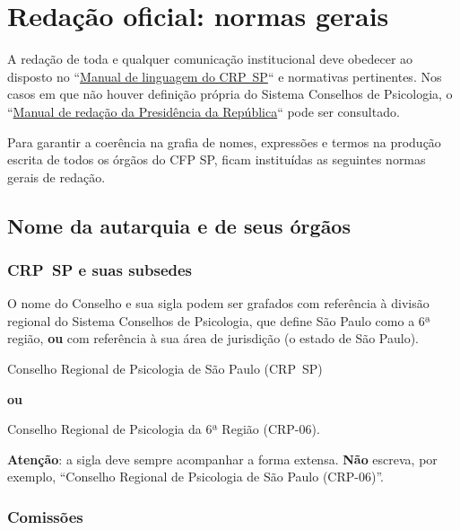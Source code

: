 \chapter{Redação oficial: normas gerais}

A redação de toda e qualquer comunicação institucional deve obedecer ao
disposto no ``\href{http://cedoc.crpsp.org.br/handle/1/2938}{Manual de
  linguagem do CRP~SP}`` e normativas pertinentes. Nos casos em que não
houver definição própria do Sistema Conselhos de Psicologia, o
``\href{https://www4.planalto.gov.br/centrodeestudos/assuntos/manual-de-redacao-da-presidencia-da-republica/manual-de-redacao.pdf}{Manual
  de redação da Presidência da República}`` pode ser consultado.

Para garantir a coerência na grafia de nomes, expressões e termos na
produção escrita de todos os órgãos do CFP SP, ficam instituídas as
seguintes normas gerais de redação.

\section{Nome da autarquia e de seus
  órgãos}

\subsection{CRP~SP e suas subsedes}

O nome do Conselho e sua sigla podem ser grafados com referência à
divisão regional do Sistema Conselhos de Psicologia, que define São
Paulo como a 6ª região, \textbf{ou} com referência à sua área de
jurisdição (o estado de São Paulo).

Conselho Regional de Psicologia de São Paulo (CRP~SP)

\textbf{ou}

Conselho Regional de Psicologia da 6ª Região (CRP-06).

\textbf{Atenção}: a sigla deve sempre acompanhar a forma extensa.
\textbf{Não} escreva, por exemplo, ``Conselho Regional de Psicologia de
São Paulo (CRP-06)''.

\subsection{Comissões}

